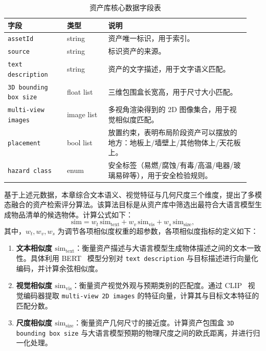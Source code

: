 \begin{table}[t]
  \centering
  \renewcommand{\arraystretch}{1.15}
  \caption{资产库核心数据字段表}
  \label{tab:asset_metadata_fields}
  \begin{tabular}{p{0.23\linewidth} p{0.16\linewidth} p{0.55\linewidth}}
    \hline
    \textbf{字段} & \textbf{类型} & \textbf{说明} \\
    \hline
    \texttt{assetId} & string &
    资产唯一标识，用于索引。 \\
    \texttt{source} & string &
    标识资产的来源。 \\
    \texttt{text description} & string &
    资产的文字描述，用于文字语义匹配。\\
    \texttt{3D bounding box size} & float list &
    三维包围盒长宽高，用于尺寸大小匹配。 \\
    \texttt{multi-view images} & image list &
    多视角渲染得到的 2D 图像集合，用于视觉相似度匹配。 \\
    \texttt{placement}  & bool list &
    放置约束，表明布局阶段资产可以摆放的地方：地板上/墙壁上/其他物体上/天花板上。 \\
    \texttt{hazard class} & enum  &
    安全标签（易燃/腐蚀/有毒/高温/电器/玻璃易碎等），用于安全检验规则。 \\
    \hline
  \end{tabular}
\end{table}


基于上述元数据，本章综合文本语义、视觉特征与几何尺度三个维度，提出了多模态融合的资产检索评分算法。该算法目标是从资产库中筛选出最符合大语言模型生成物品清单的候选物体。计算公式如下：
\begin{equation}
\mathrm{sim} = w_t\,\mathrm{sim}_{\text{text}} + w_v\,\mathrm{sim}_{\text{vis}} + w_s\,\mathrm{sim}_{\text{size}},
\label{eq:sim_fusion}
\end{equation}
其中，$w_t, w_v, w_s$ 为调节各项相似度权重的超参数，各项相似度指标的定义如下：
\begin{enumerate}
\item \textbf{文本相似度 $\mathrm{sim}_{\text{text}}$}：衡量资产描述与大语言模型生成物体描述之间的文本一致性。具体利用 BERT~\cite{devlin2018bert} 模型分别对 \texttt{text description} 与目标描述进行向量化编码，并计算余弦相似度。
\item \textbf{视觉相似度 $\mathrm{sim}_{\text{vis}}$}：衡量资产视觉外观与预期类别的匹配度。通过 CLIP~\cite{radford2021learning} 视觉编码器提取 \texttt{multi-view 2D images} 的特征向量，计算其与目标文本特征的匹配分数。
\item \textbf{尺度相似度 $\mathrm{sim}_{\text{size}}$}：衡量资产几何尺寸的接近度。计算资产包围盒 \texttt{3D bounding box size} 与大语言模型预期的物理尺度之间的欧氏距离，并进行归一化处理。

\end{enumerate}

